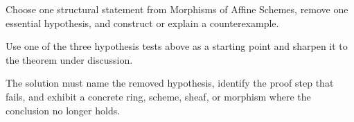 \begin{exercise}\label{exr:vi19-expand-16}
Choose one structural statement from Morphisms of Affine Schemes, remove one essential hypothesis, and construct or explain a counterexample.
\end{exercise}
\begin{hint}
Use one of the three hypothesis tests above as a starting point and sharpen it to the theorem under discussion.
\end{hint}
\begin{solution}
The solution must name the removed hypothesis, identify the proof step that fails, and exhibit a concrete ring, scheme, sheaf, or morphism where the conclusion no longer holds.
\end{solution}

